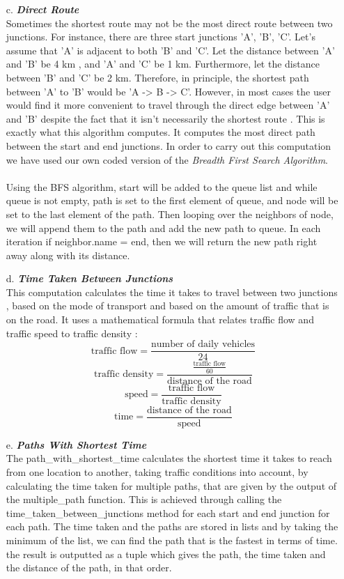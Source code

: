 \documentclass[fontsize=11pt]{IEEEtran}
\begin{document}
\begin{enumerate}
\\
   \item[c.] \textbf{\textit{Direct Route}}\\
   Sometimes the shortest route may not be the most direct route between two junctions. For instance, there are three start junctions 'A', 'B', 'C'. Let's assume that 'A' is adjacent to both 'B' and 'C'.  Let the distance between 'A' and 'B' be 4 km , and 'A' and 'C' be 1 km. Furthermore, let the distance between 'B' and 'C'  be 2 km. Therefore, in principle, the shortest path between 'A' to 'B' would be 'A -> B -> C'. However, in most cases the user would find it more convenient to travel through the direct edge between 'A' and 'B' despite the fact that it isn't necessarily the shortest route . This is exactly what this algorithm computes. It computes the most direct path between the start and end junctions. In order to carry out this computation we have used our own coded version of the \textit{Breadth First Search Algorithm}.\cite{4} \cite{5} \\
   \\
   Using the BFS algorithm, start will be added to the queue list and while queue is not empty, path is set to the first element of queue, and node will be set to the last element of the path. Then looping over the neighbors of node, we will append them to the path and add the new path to queue. In each iteration if neighbor.name = end, then we will return the new path right away along with its distance.
 \\
   \item[d.] \textbf{\textit{Time Taken Between Junctions}}\\
   This computation calculates the time it takes to travel between two junctions , based on the mode of transport and based on the amount of traffic that is on the road. It uses a mathematical formula that relates traffic flow and traffic speed to traffic density \cite{6}:
   \[
    \text{traffic flow} = \frac{\text{number of daily vehicles}}{24}
   \]
   \[
   \text{traffic density} = \frac{\frac{\text{traffic flow}}{60}}{\text{distance of the road}}
   \]
   \[
   \text{speed} = \frac{\text{traffic flow}}{\text{traffic density}}
   \]
   \[
   \text{time} = \frac{\text{distance of the road}}{\text{speed}}
   \]
\newpage
   \item[e.] \textbf{\textit{Paths With Shortest Time}}\\
   The path\_with\_shortest\_time calculates the shortest time it takes to reach from one location to another, taking traffic conditions into account, by calculating the time taken for multiple paths, that are given by the output of the multiple\_path function. This is achieved through calling the time\_taken\_between\_junctions method for each start and end junction for each path. The time taken and the paths are stored in lists and by taking the minimum of the list, we can find the path that is the fastest in terms of time. the result is outputted as a tuple which gives the path, the time taken and the distance of the path, in that order.

\end{enumerate}
\end{document}
